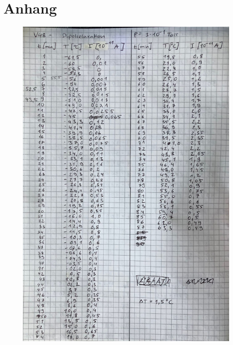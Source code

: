 \section{Anhang}
\label{sec:anhang}

\begin{figure}
    \centering
    \includegraphics[width=\textwidth]{bilder/Anhang_1.jpeg}
    \label{fig:originaldaten1}
\end{figure}
